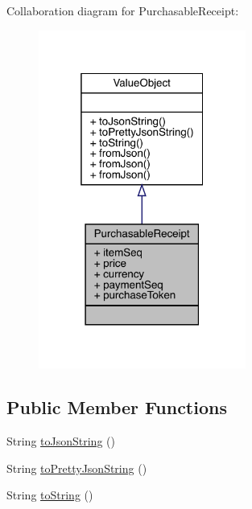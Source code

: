 Collaboration diagram for Purchasable\+Receipt\+:\nopagebreak
\begin{figure}[H]
\begin{center}
\leavevmode
\includegraphics[width=193pt]{classcom_1_1toast_1_1android_1_1gamebase_1_1base_1_1purchase_1_1_purchasable_receipt__coll__graph}
\end{center}
\end{figure}
\subsection*{Public Member Functions}
\begin{DoxyCompactItemize}
\item 
String \hyperlink{classcom_1_1toast_1_1android_1_1gamebase_1_1base_1_1_value_object_a58acf6402880e9769d79d8667581fa6a}{to\+Json\+String} ()
\item 
String \hyperlink{classcom_1_1toast_1_1android_1_1gamebase_1_1base_1_1_value_object_a054431f3d988a22295cfc8b784ff2637}{to\+Pretty\+Json\+String} ()
\item 
String \hyperlink{classcom_1_1toast_1_1android_1_1gamebase_1_1base_1_1_value_object_ad146fa8579a5f8a876c4688cc5a68520}{to\+String} ()
\end{DoxyCompactItemize}
